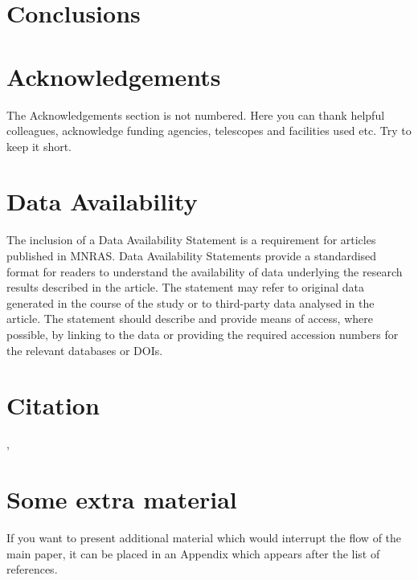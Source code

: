 \documentclass[fleqn,usenatbib]{mnras}
\begin{document}
\section{Conclusions}



\section*{Acknowledgements}

The Acknowledgements section is not numbered. Here you can thank helpful
colleagues, acknowledge funding agencies, telescopes and facilities used etc.
Try to keep it short.

\section*{Data Availability}

 
The inclusion of a Data Availability Statement is a requirement for articles published in MNRAS. Data Availability Statements provide a standardised format for readers to understand the availability of data underlying the research results described in the article. The statement may refer to original data generated in the course of the study or to third-party data analysed in the article. The statement should describe and provide means of access, where possible, by linking to the data or providing the required accession numbers for the relevant databases or DOIs.

\section{Citation}
\cite{Sato_2009}, \cite{2015MNRAS.453.3043S}




 



\appendix

\section{Some extra material}

If you want to present additional material which would interrupt the flow of the main paper,
it can be placed in an Appendix which appears after the list of references.



\bsp	%
\label{lastpage}
\end{document}
